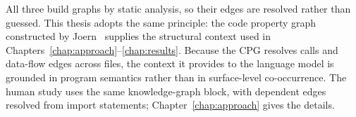 All three build graphs by static analysis, so their edges are resolved rather
than guessed. This thesis adopts the same principle: the code property graph
constructed by Joern~\cite{yamaguchi2014cpg} supplies the structural context
used in Chapters~\ref{chap:approach}--\ref{chap:results}. Because the CPG
resolves calls and data-flow edges across files, the context it provides to the
language model is grounded in program semantics rather than in surface-level
co-occurrence. The human study uses the same knowledge-graph block, with dependent
edges resolved from import statements; Chapter~\ref{chap:approach} gives
the details.
